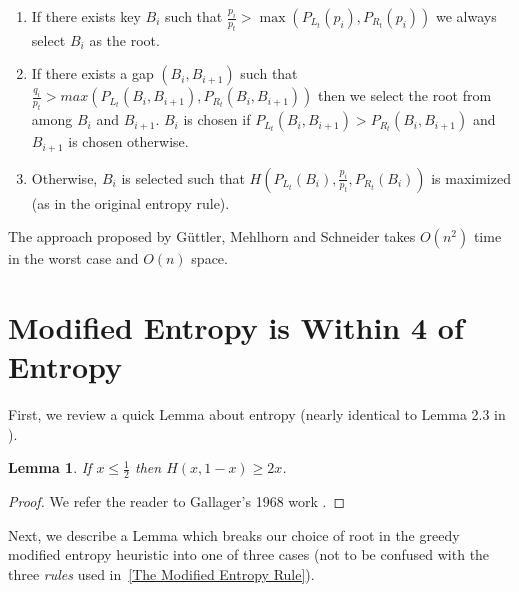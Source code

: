 \documentclass[letterpaper,12pt,titlepage,oneside,final]{book}
\theoremstyle{plain}
\newtheorem{lem}[thm]{Lemma}
\begin{document}
\begin{enumerate}[label=\alph*)]
\item If there exists key $B_i$ such that $\frac{p_i}{p_t} > \max(P_{L_t}(p_i), P_{R_t}(p_i))$ we always select $B_i$ as the root.

\item If there exists a gap $(B_i, B_{i+1})$ such that $\frac{q_i}{p_t} > max(P_{L_t}(B_i, B_{i+1}), P_{R_t}(B_i, B_{i+1}))$ then we select the root from among $B_i$ and $B_{i+1}$. $B_i$ is chosen if $P_{L_t}(B_i, B_{i+1}) > P_{R_t}(B_i, B_{i+1})$ and $B_{i+1}$ is chosen otherwise.

\item Otherwise, $B_i$ is selected such that $H(P_{L_t}(B_i), \frac{p_i}{p_t}, P_{R_t}(B_i))$ is maximized (as in the original entropy rule).

\end{enumerate}

The approach proposed by G{\"u}ttler, Mehlhorn and Schneider takes $O(n^2)$ time in the worst case and $O(n)$ space.

\section{Modified Entropy is Within 4 of Entropy}

First, we review a quick Lemma about entropy (nearly identical to Lemma 2.3 in \cite{bayer1975improved}).

\begin{lem}\label{entr2x}
If $x \leq \frac{1}{2}$ then $H(x, 1-x) \geq 2x$.
\end{lem}
\begin{proof}
We refer the reader to Gallager's 1968 work \cite{gallager1968information}.
\end{proof}

Next, we describe a Lemma which breaks our choice of root in the greedy modified entropy heuristic into one of three cases (not to be confused with the three \textit{rules} used in~\ref{The Modified Entropy Rule}). 
\end{document}
